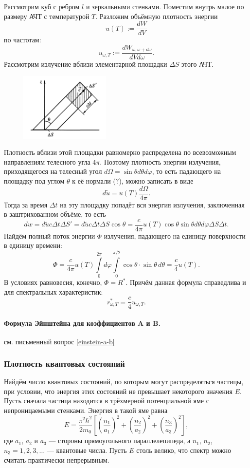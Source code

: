 Рассмотрим куб с ребром $ l $ и зеркальными стенками. Поместим внутрь малое по
размеру АЧТ с температурой $ T $. Разложим объёмную плотность энергии  
\[
    u(T) := \frac{dW}{dV}
\]
по частотам: 
\[
  u_{\omega, T} := \frac{dW_{\omega, \omega + d\omega}}{dVd\omega}.
\]
Рассмотрим излучение вблизи элементарной площадки $ \Delta S $ этого АЧТ.

\begin{figure}[h!]
  \centering
  \includegraphics[width=0.4\textwidth]{img/oral-03/acht.png}
  \label{fig:acht}
\end{figure}

Плотность вблизи этой площадки равномерно распределена по всевозможным
направлениям телесного угла $ 4\pi $. Поэтому плотность энергии излучения,
приходящегося на телесный угол $ d\Omega = \sin \theta d\theta d\varphi $, то
есть падающего на площадку под углом $ \theta $ к её нормали (?), можно записать в
виде
\[
    d\tilde u = u(T) \frac{d\Omega}{4\pi}.
\]
Тогда за время $ \Delta t $ на эту площадку попадёт вся энергия излучения,
заключенная в заштрихованном объёме, то есть 
\[
    dw = d\tilde u c \Delta t \Delta S' = d\tilde u c\Delta t \Delta S \cos
    \theta = \frac{c}{4\pi} u(T)\cos \theta \sin\theta d\theta d\varphi\Delta S
    \Delta t.
\]
Найдём полный поток энергии $ \Phi $ излучения, падающего на единицу поверхности
в единицу времени: 
\[
    \Phi = \frac{c}{4\pi}u(T) \int\limits_{0}^{2\pi}d\varphi
    \int\limits_{0}^{\pi/2}\cos\theta\cdot \sin\theta\,d\theta =
    \frac{c}{4}u(T).
\]
В условиях равновесия, конечно, $ \Phi = R^\ast $. Причём данная формула
справедлива и для спектральных характеристик: 
\[
  r^\ast_{\omega, T} = \frac{c}{4}u_{\omega, T}.
\]


\paragraph{Формула Эйнштейна для коэффициентов A и B.} см. письменный вопрос \ref{einstein-a-b}

\subsubsection{Плотность квантовых состояний}
Найдём число квантовых состояний, по которым могут распределяться частицы, при
условии, что энергия этих состояний не превышает некоторого значения $ E $.
Пусть сначала частица находится в трёхмерной потенциальной яме с непроницаемыми
стенками. Энергия в такой яме равна 
\[
  E = \frac{\pi^2\hbar^2}{2m_0} \left[ \left( \frac{n_1}{a_1} \right)^2 + \left(
  \frac{n_2}{a_2}\right)^2 + \left( \frac{n_3}{a_3} \right)^2   \right],
\]
где $ a_1 $, $ a_2 $ и $ a_3 $ --- стороны прямоугольного параллелепипеда, а $
n_1 $, $ n_2 $, $ n_3 = 1, 2, 3,\ldots$ --- квантовые числа. Пусть $ E $ столь
велико, что спектр можно считать практически непрерывным.

